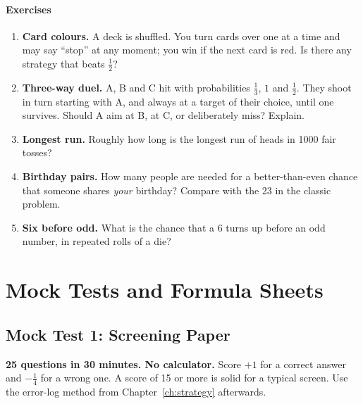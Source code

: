 \documentclass[11pt,a4paper,openany]{report}
\newenvironment{exercises}{\subsection*{Exercises \thechapter}\begin{enumerate}[label=\textbf{\thechapter.\arabic*},leftmargin=3.2em]}{\end{enumerate}}
\begin{document}
\begin{exercises}
\item \textbf{Card colours.} A deck is shuffled. You turn cards over one at a time and may say ``stop'' at any moment; you win if the next card is red. Is there any strategy that beats $\frac12$?
\item \textbf{Three-way duel.} A, B and C hit with probabilities $\frac13$, $1$ and $\frac12$. They shoot in turn starting with A, and always at a target of their choice, until one survives. Should A aim at B, at C, or deliberately miss? Explain.
\item \textbf{Longest run.} Roughly how long is the longest run of heads in 1000 fair tosses?
\item \textbf{Birthday pairs.} How many people are needed for a better-than-even chance that someone shares \emph{your} birthday? Compare with the 23 in the classic problem.
\item \textbf{Six before odd.} What is the chance that a 6 turns up before an odd number, in repeated rolls of a die?
\end{exercises}
\part{Mock Tests and Formula Sheets}
\chapter{Mock Test 1: Screening Paper}\label{ch:mock1}
\textbf{25 questions in 30 minutes. No calculator.} Score $+1$ for a correct answer and $-\frac14$ for a wrong one. A score of 15 or more is solid for a typical screen. Use the error-log method from Chapter~\ref{ch:strategy} afterwards.
\end{document}
